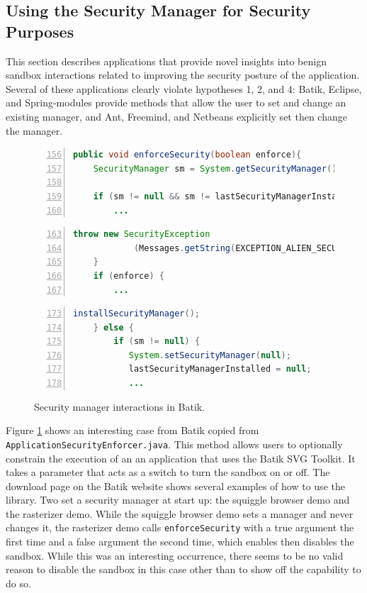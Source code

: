 \documentclass{sig-alternate}
\begin{document}
\subsection{Using the Security Manager for Security Purposes}\label{sub:Using-the-Security}

This section describes applications that provide novel insights into benign sandbox interactions related to improving the security
posture of the application. Several of these applications clearly violate hypotheses 1, 2, and 4: Batik, Eclipse, and Spring-modules provide
methods that allow the user to set and change an existing manager,
and Ant, Freemind, and Netbeans explicitly set then change the manager.

\begin{figure}
\begin{lstlisting}[language=Java,numbers=left,basicstyle={\scriptsize},breaklines=true,firstnumber=156,xrightmargin={0.1cm},numbersep={-10pt}]
    public void enforceSecurity(boolean enforce){ 
    SecurityManager sm = System.getSecurityManager();

    if (sm != null && sm != lastSecurityManagerInstalled){
        ...
\end{lstlisting}


\begin{lstlisting}[language=Java,numbers=left,basicstyle={\scriptsize},breaklines=true,firstnumber=163,xrightmargin={0.1cm},numbersep={-10pt}]
        throw new SecurityException
            (Messages.getString(EXCEPTION_ALIEN_SECURITY_MANAGER));   
    }                  
    if (enforce) { 
        ...
\end{lstlisting}


\begin{lstlisting}[language=Java,numbers=left,basicstyle={\scriptsize},breaklines=true,firstnumber=173,xrightmargin={0.1cm},numbersep={-10pt}]
        installSecurityManager();         
    } else {             
        if (sm != null) {                 
           System.setSecurityManager(null);
           lastSecurityManagerInstalled = null;             
           ...
\end{lstlisting}


\protect\caption{Security manager interactions in Batik.}\label{fig:Batik-snippet}
\end{figure}


Figure \ref{fig:Batik-snippet} shows an interesting case from Batik
copied from \texttt{ApplicationSecurityEnforcer.java}. This method
allows users to optionally constrain the execution of an an application
that uses the Batik SVG Toolkit. It takes a parameter that acts as
a switch to turn the sandbox on or off. The download page on the Batik
website shows several examples of how to use the library. Two set
a security manager at start up: the squiggle browser demo and the
rasterizer demo. While the squiggle browser demo sets a manager and
never changes it, the rasterizer demo calls \texttt{enforceSecurity}
with a true argument the first time and a false argument the second
time, which enables then disables the sandbox. While this was an interesting
occurrence, there seems to be no valid reason to disable the sandbox
in this case other than to show off the capability to do so.
\end{document}
